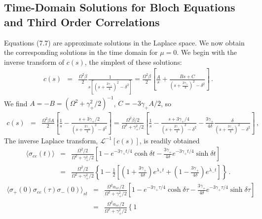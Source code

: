 \documentclass[twocolumn,aps,eqsecnum,showkeys,amsmath]{revtex4-2}
\begin{document}
\begin{widetext}
\subsection{Time-Domain Solutions for Bloch Equations and Third Order 
Correlations} %
Equations (7.7) are approximate solutions in the Laplace space. We 
now obtain the corresponding solutions in the time domain for $\mu=0$. 
We begin with the inverse transform of $c(s)$, the simplest of these solutions:  
%
\begin{eqnarray*} 	
c(s) &=& \frac{\Omega^2 \beta}{2} \frac{1}{s \left[ \left( s +\frac{3 \gamma_+}{4} 
	\right)^2 - \delta^2  \right]}	
	= \frac{\Omega^2 \beta}{2} \left[ \frac{A}{s} 
	+\frac{Bs +C}{ \left( s +\frac{3 \gamma_+}{4} \right)^2 - \delta^2 } \right]  \,.
\end{eqnarray*}
We find $A =-B =(\Omega^2 +\gamma_+^2/2)^{-1}$, $C =-3 \gamma_+ A/2$, so 
%
\begin{eqnarray} 	
c(s) &=& \frac{\Omega^2 \beta A}{2} \left[ \frac{1}{s} 
	-\frac{s +3 \gamma_+/2}
	{ \left( s +\frac{3 \gamma_+}{4} \right)^2 - \delta^2 } \right]  
	= \frac{\Omega^2 \beta/2}{\Omega^2 +\gamma_+^2/2} \left[ \frac{1}{s} 
	-\frac{s +3 \gamma_+/4}
	{ \left( s +\frac{3 \gamma_+}{4} \right)^2 - \delta^2 } 
	 -\frac{3 \gamma_+}{4 \delta} \frac{\delta}
	{ \left( s +\frac{3 \gamma_+}{4} \right)^2 - \delta^2 }  \right]  \,, 
\end{eqnarray}
The inverse Laplace transform, $\mathcal{L}^{-1} [c(s)]$, is readily obtained 
%
\begin{eqnarray} 	
\langle \sigma_{ee} (t) \rangle 
&=& \frac{\Omega^2/2}{\Omega^2 +\gamma_+^2/2} 
	\left[ 1 -e^{-3\gamma_+ t/4} \cosh{\delta t} 
	-\frac{3 \gamma_+}{4 \delta} e^{-3\gamma_+ t/4} \sinh{\delta t}  
	 \right] 	\nonumber \\  
	&=& \frac{\Omega^2/2}{\Omega^2 +\gamma_+^2/2} \left\{ 1 
	-\frac{1}{2} \left[ \left( 1+\frac{3 \gamma_+}{4 \delta} \right) e^{\lambda_+ t}  	
	+ \left( 1-\frac{3 \gamma_+}{4 \delta} \right) e^{\lambda_- t} 
	 \right] \right\} 	\,.  
\end{eqnarray}
%
\begin{eqnarray} 	\label{eq:G2shelving}
\langle \sigma_+ (0) \sigma_{ee} (\tau) \sigma_-(0) \rangle_{st} 
&=& \frac{\Omega^2 \alpha_{ee}/2}{\Omega^2 +\gamma_+^2/2} 
	\left[ 1 -e^{-3\gamma_+ \tau/4} \cosh{\delta \tau} 
	-\frac{3 \gamma_+}{4 \delta} e^{-3\gamma_+ \tau/4} \sinh{\delta \tau}  
	 \right] 	\nonumber \\  
&=& \frac{\Omega^2 \alpha_{ee}/2}{\Omega^2 +\gamma_+^2/2} \left\{ 1 

\end{eqnarray}
\end{widetext}
\end{document}
